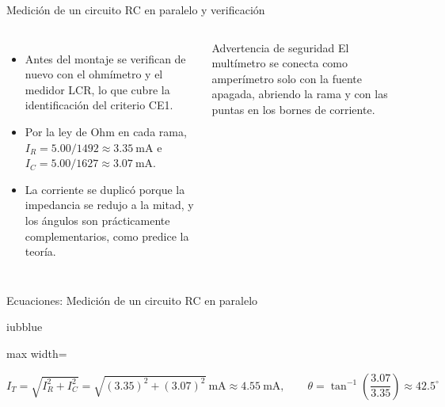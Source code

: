 \documentclass[aspectratio=169,11pt,xcolor={table}]{beamer}
\begin{document}
\begin{frame}{{\normalsize Medición de un circuito RC en paralelo y verificación}}
\begin{columns}[c,onlytextwidth]
\small
\begin{itemize}\setlength{\itemsep}{4pt}
  \item Antes del montaje se verifican de nuevo con el ohmímetro y el medidor LCR, lo que cubre la identificación del criterio CE1.
  \item Por la ley de Ohm en cada rama, $I_R = 5.00/1492 \approx 3.35\ \text{mA}$ e $I_C = 5.00/1627 \approx 3.07\ \text{mA}$.
  \item La corriente se duplicó porque la impedancia se redujo a la mitad, y los ángulos son prácticamente complementarios, como predice la teoría.
\end{itemize}
\begin{cardO}{Advertencia de seguridad}
\footnotesize El multímetro se conecta como amperímetro solo con la fuente apagada, abriendo la rama y con las puntas en los bornes de corriente.
\end{cardO}
\end{columns}
\end{frame}

\begin{frame}{Ecuaciones: Medición de un circuito RC en paralelo}
\begin{cajaplana}{iubblue}
\centering
\begin{adjustbox}{max width=\linewidth}
\begin{minipage}{1.87\linewidth}
{\large
\begin{equation*}
  I_T = \sqrt{I_R^{2} + I_C^{2}} = \sqrt{(3.35)^2 + (3.07)^2}\ \text{mA} \approx 4.55\ \text{mA}, \qquad \theta = \tan^{-1}\!\left(\frac{3.07}{3.35}\right) \approx 42.5^\circ
\end{equation*}
}
\end{minipage}
\end{adjustbox}
\end{cajaplana}
\end{frame}
\end{document}
